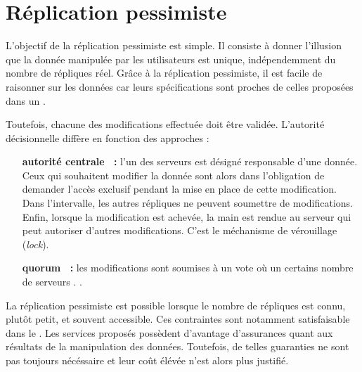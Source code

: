 \section{Réplication pessimiste}
\label{repl:sec:pessimistic}

L'objectif de la réplication pessimiste est simple. Il consiste à donner
l'illusion que la donnée manipulée par les utilisateurs est unique,
indépendemment du nombre de répliques réel. Grâce à la réplication pessimiste,
il est facile de raisonner sur les données car leurs spécifications sont proches
de celles proposées dans un .

Toutefois, chacune des modifications effectuée doit être validée. L'autorité
décisionnelle diffère en fonction des approches :
\begin{itemize}
\item [\textbf{autorité centrale~\cite{alsberg1976principle} :}] l'un des
  serveurs est désigné responsable d'une donnée. Ceux qui souhaitent modifier la
  donnée sont alors dans l'obligation de demander l'accès exclusif pendant la
  mise en place de cette modification. Dans l'intervalle, les autres répliques
  ne peuvent soumettre de modifications. Enfin, lorsque la modification est
  achevée, la main est rendue au serveur qui peut autoriser d'autres
  modifications. C'est le méchanisme de vérouillage (\emph{lock}).
\item [\textbf{quorum~\cite{gifford1979weighted} :}] les modifications sont
  soumises à un vote où un certains nombre de serveurs . .
\end{itemize}

La réplication pessimiste est possible lorsque le nombre de répliques est connu,
plutôt petit, et souvent accessible. Ces contraintes sont notamment
satisfaisable dans le . Les services proposés possèdent d'avantage
d'assurances quant aux résultats de la manipulation des données. Toutefois, de
telles guaranties ne sont pas toujours nécéssaire et leur coût élévée n'est
alors plus justifié. 

